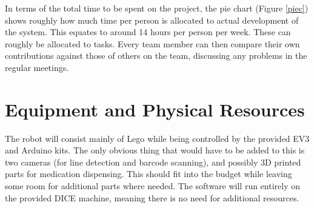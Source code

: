 \documentclass[a4paper,10pt,DIV10,openright,openbib]{scrreprt}
\begin{document}
In terms of the total time to be spent on the project, the pie chart (Figure \ref{piec}) shows roughly how
much time per person is allocated to actual development of the system. This equates to around
14 hours per person per week. These can roughly be allocated to tasks. Every
team member
can then  compare their own contributions against those of others on the team, discussing any
problems in the regular meetings.

\section{Equipment and Physical Resources}
The robot will consist mainly of Lego while being controlled by the provided EV3 and Arduino kits. 
The only obvious thing that would have to be added to this is two cameras (for line detection and 
barcode scanning), and possibly 3D printed parts for medication dispensing. This should fit into 
the budget while leaving some room for additional parts where needed.
The software will run entirely on the provided DICE machine, meaning there is no need for additional
 resources.
\end{document}
